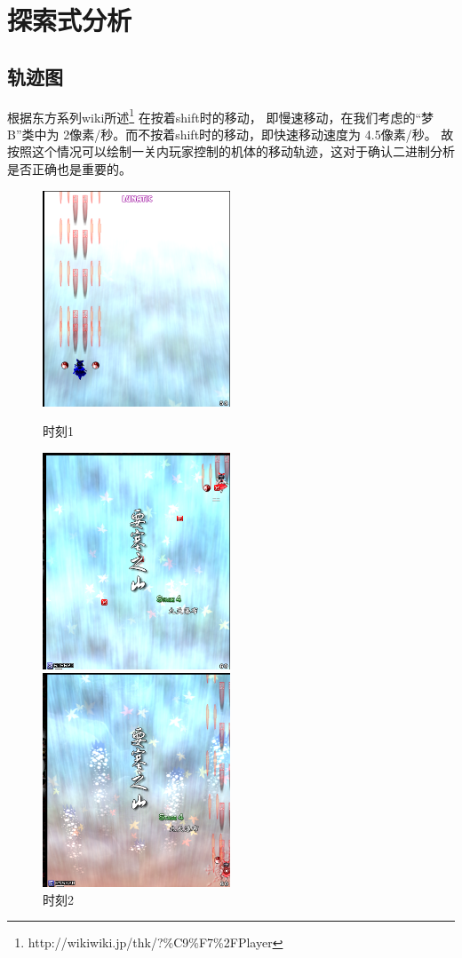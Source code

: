 \documentclass[UTF8]{ctexart}
\begin{document}
\section{探索式分析}

\subsection{轨迹图}

根据东方系列wiki所述\footnote{ http://wikiwiki.jp/thk/?\%C9\%F7\%2FPlayer } 在按着shift时的移动，
即慢速移动，在我们考虑的“梦B”类中为 2像素/秒。而不按着shift时的移动，即快速移动速度为 4.5像素/秒。
故按照这个情况可以绘制一关内玩家控制的机体的移动轨迹，这对于确认二进制分析是否正确也是重要的。

\begin{figure}[H]
\begin{minipage}[t]{0.5\linewidth}
\centering
\includegraphics[width=2.2in]{images/touhou1.png}
\caption{时刻1}
\end{minipage}%
\begin{minipage}[t]{0.5\linewidth}
\centering
\includegraphics[width=2.2in]{images/touhou2.png}
\caption{时刻2}
\end{minipage}
\begin{minipage}[t]{0.5\linewidth}
\centering
\includegraphics[width=2.2in]{images/touhou3.png}

\end{minipage}
\end{figure}
\end{document}
